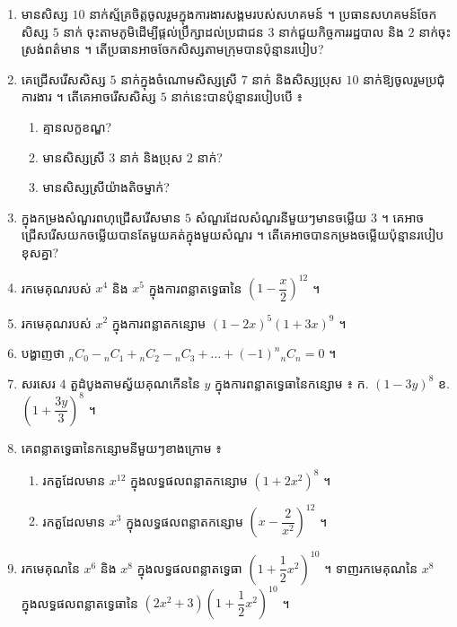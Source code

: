 \begin{enumerate}[1]
  \begin{enumerate}[a]
    \item កីឡាករត្រូវប្រកួតមានភេទដូចគ្នា
    \item កីឡាករត្រូវប្រកួតមានចំនួនស្រីស្មើនឹងបុរស ។
    \item ក្រុមប្រកួតមានបុរសឈ្មោះ $A$ ឬក្រុមមានបុរសឈ្មោះ $B$ ប៉ុន្តែមិនមែនជាក្រុមមានបុរសឈ្មោះ $A$ និង $B$ ។
  \end{enumerate}
  \item មានសិស្ស $10$ នាក់ស្ម័គ្រចិត្តចូលរួមក្នុងការងារសង្គមរបស់សហគមន៍ ។ ប្រធានសហគមន៍ចែកសិស្ស $5$ នាក់ ចុះតាមភូមិដើម្បីផ្ដល់ប្រឹក្សាដល់ប្រជាជន $3$ នាក់ជួយកិច្ចការរដ្ឋបាល និង $2$ នាក់ចុះស្រង់ពត៌មាន ។ តើប្រធានអាចចែកសិស្សតាមក្រុមបានប៉ុន្មានរបៀប?
  \item គេជ្រើសរើសសិស្ស $5$ នាក់ក្នុងចំណោមសិស្សស្រី $7$ នាក់ និងសិស្សប្រុស $10$ នាក់ឱ្យចូលរួមប្រជុំការងារ ។ តើគេអាចរើសសិស្ស $5$ នាក់នេះបានប៉ុន្មានរបៀបបើ ៖
  \begin{enumerate}[a]
    \item គ្មានលក្ខខណ្ឌ?
    \item មានសិស្សស្រី $3$ នាក់ និងប្រុស $2$ នាក់?
    \item មានសិស្សស្រីយ៉ាងតិចម្នាក់?
  \end{enumerate}
  \item ក្នុងកម្រងសំណួរពហុជ្រើសរើសមាន $5$ សំណួរដែលសំណួរនីមួយៗមានចម្លើយ $3$ ។ គេអាចជ្រើសរើសយកចម្លើយបានតែមួយគត់ក្នុងមួយសំណួរ ។ តើគេអាចបានកម្រងចម្លើយប៉ុន្មានរបៀបខុសគ្នា?
  \item រកមេគុណរបស់ $x^4$ និង $x^5$ ក្នុងការពន្លាតទ្វេធានៃ $\left(1 - \dfrac{x}{2}\right)^{12}$ ។
  \item រកមេគុណរបស់ $x^2$ ក្នុងការពន្លាតកន្សោម $(1 - 2x)^5(1 + 3x)^9$ ។
  \item បង្ហាញថា ${}_nC_0 - {}_nC_1 + {}_nC_2 - {}_nC_3 + \dots + (-1)^n{}_nC_n = 0$ ។
  \item សរសេរ $4$ តួដំបូងតាមស្វ័យគុណកើននៃ $y$ ក្នុងការពន្លាតទ្វេធានៃកន្សោម ៖ \quad ក. $(1 - 3y)^8$ \quad ខ. $\left(1 + \dfrac{3y}{3}\right)^8$ ។
  \item គេពន្លាតទ្វេធានៃកន្សោមនីមួយៗខាងក្រោម ៖
  \begin{enumerate}[a]
    \item រកតួដែលមាន $x^{12}$ ក្នុងលទ្ធផលពន្លាតកន្សោម $(1 + 2x^2)^8$ ។
    \item រកតួដែលមាន $x^3$ ក្នុងលទ្ធផលពន្លាតកន្សោម $\left(x - \dfrac{2}{x^2}\right)^{12}$ ។
  \end{enumerate}
  \item រកមេគុណនៃ $x^6$ និង $x^8$ ក្នុងលទ្ធផលពន្លាតទ្វេធា $\left(1 + \dfrac{1}{2}x^2\right)^{10}$ ។ ទាញរកមេគុណនៃ $x^8$ ក្នុងលទ្ធផលពន្លាតទ្វេធានៃ $(2x^2 + 3)\left(1 + \dfrac{1}{2}x^2\right)^{10}$ ។

\end{enumerate}
